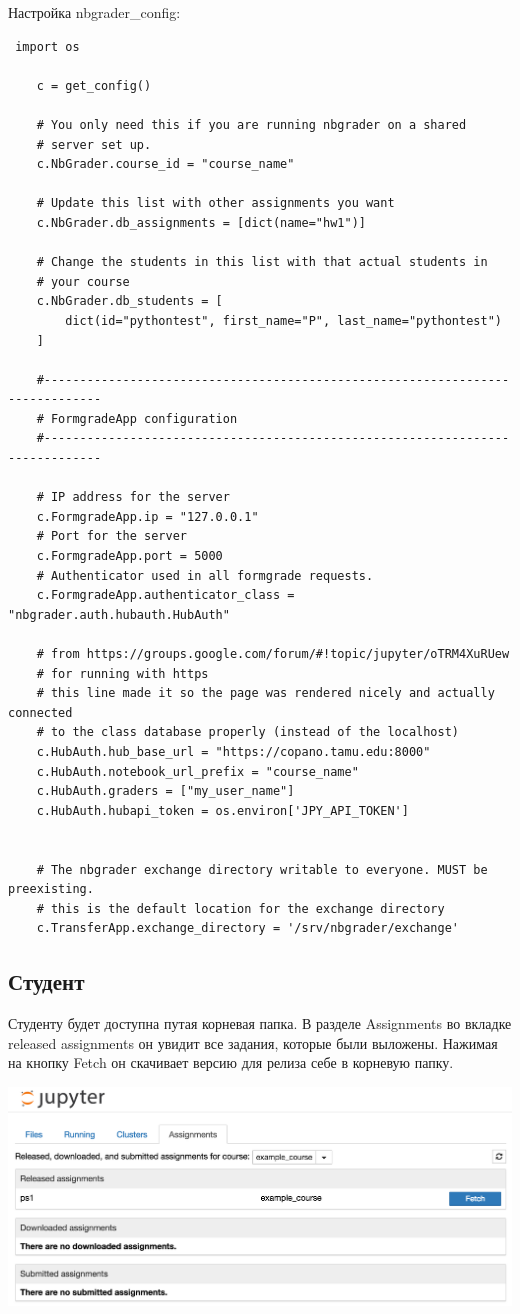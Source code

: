 \documentclass[a4paper,12pt]{article}
\begin{document}
Настройка nbgrader\_config:
\begin{verbatim}
 import os

    c = get_config()

    # You only need this if you are running nbgrader on a shared
    # server set up.
    c.NbGrader.course_id = "course_name"

    # Update this list with other assignments you want
    c.NbGrader.db_assignments = [dict(name="hw1")]

    # Change the students in this list with that actual students in
    # your course
    c.NbGrader.db_students = [
        dict(id="pythontest", first_name="P", last_name="pythontest")
    ]

    #------------------------------------------------------------------------------
    # FormgradeApp configuration
    #------------------------------------------------------------------------------

    # IP address for the server
    c.FormgradeApp.ip = "127.0.0.1"
    # Port for the server
    c.FormgradeApp.port = 5000
    # Authenticator used in all formgrade requests.
    c.FormgradeApp.authenticator_class = "nbgrader.auth.hubauth.HubAuth"

    # from https://groups.google.com/forum/#!topic/jupyter/oTRM4XuRUew
    # for running with https
    # this line made it so the page was rendered nicely and actually connected
    # to the class database properly (instead of the localhost)
    c.HubAuth.hub_base_url = "https://copano.tamu.edu:8000"
    c.HubAuth.notebook_url_prefix = "course_name"
    c.HubAuth.graders = ["my_user_name"]
    c.HubAuth.hubapi_token = os.environ['JPY_API_TOKEN']


    # The nbgrader exchange directory writable to everyone. MUST be preexisting.
    # this is the default location for the exchange directory
    c.TransferApp.exchange_directory = '/srv/nbgrader/exchange'
\end{verbatim}


\subsection{Студент}
Студенту будет доступна путая корневая папка. В разделе Assignments во вкладке released assignments он увидит все задания, которые были выложены. Нажимая на кнопку Fetch он скачивает версию для релиза себе в корневую папку. 

\includegraphics[width=\textwidth]{assignment_list_released}
\end{document}
